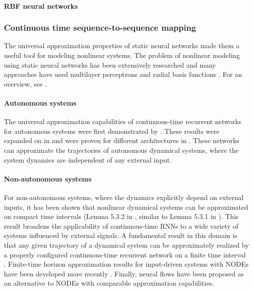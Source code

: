 \documentclass{article}
\theoremstyle{definition} \newtheorem{definition}{Definition}
\theoremstyle{remark} \newtheorem{remark}{Remark}
\newcounter{ct}
\begin{document}
\paragraph{RBF neural networks}
\citep{tan1995efficient}



\subsubsection{Continuous time sequence-to-sequence mapping}
The universal approximation properties of static neural networks \citep{funahashi1989approximate} made them a useful tool for modeling nonlinear systems. 
The problem of nonlinear modeling using static neural networks has been extensively researched \citep{narendra1990identification,warwick1992neural} and many approaches have used multilayer perceptrons and radial basis functions \citep{chen1992neural,choi1996constructive,tan1995efficient}. 
For an overview, see \citep{garces2012strategies}.


\paragraph{Autonomous systems}
The universal approximation capabilities of continuous-time recurrent networks for autonomous systems were first demonstrated by \citet{funahashi1993approximation}. 
These results were expanded on in \citep{kimura1998learning} and were proven for different architectures in \citep{chow2000modeling}.
These networks can approximate the trajectories of autonomous dynamical systems, where the system dynamics are independent of any external input.


\paragraph{Non-autonomous systems}
For non-autonomous systems, where the dynamics explicitly depend on external inputs, it has been shown that nonlinear dynamical systems can be approximated on compact time intervals (Lemma 5.3.2 in \citep{garces2012strategies}, similar to Lemma 5.3.1 in \citep{smale1974differential}).
This result broadens the applicability of continuous-time RNNs to a wide variety of systems influenced by external signals.
A fundamental result in this domain is that any given trajectory of a dynamical system can be approximately realized by a properly configured continuous-time recurrent network on a finite time interval \citep{nakamura2009approximation}.  %
Finite-time horizon approximation results for input-driven systems with NODEs have been developed more recently \citep{li2022deep, ko2023homotopy, zakwan2023universal}.
Finally, neural flows have been proposed as an alternative to NODEs with comparable approximation capabilities\citep{bilos2021neural}.
	
\end{document}
